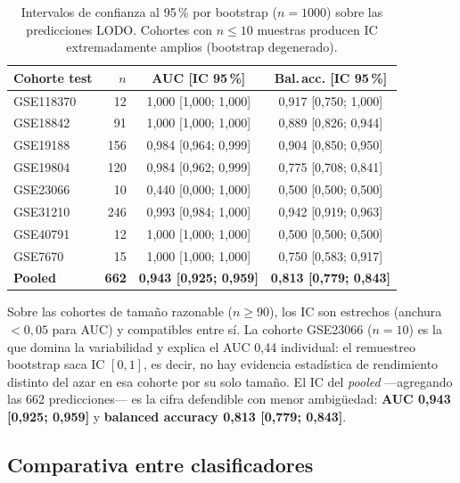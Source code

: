\begin{table}[H]
  \centering
  \small
  \caption{Intervalos de confianza al 95\,\% por bootstrap ($n=1000$) sobre
  las predicciones LODO. Cohortes con $n \leq 10$ muestras producen IC
  extremadamente amplios (bootstrap degenerado).}
  \label{tab:ic_bootstrap}
  \begin{tabular}{lrcc}
    \toprule
    \textbf{Cohorte test} & $n$ & \textbf{AUC [IC 95\,\%]} & \textbf{Bal.\,acc. [IC 95\,\%]} \\
    \midrule
    GSE118370          & 12  & 1,000 [1,000; 1,000] & 0,917 [0,750; 1,000] \\
    GSE18842           & 91  & 1,000 [1,000; 1,000] & 0,889 [0,826; 0,944] \\
    GSE19188           & 156 & 0,984 [0,964; 0,999] & 0,904 [0,850; 0,950] \\
    GSE19804           & 120 & 0,984 [0,962; 0,999] & 0,775 [0,708; 0,841] \\
    GSE23066           & 10  & 0,440 [0,000; 1,000] & 0,500 [0,500; 0,500] \\
    GSE31210           & 246 & 0,993 [0,984; 1,000] & 0,942 [0,919; 0,963] \\
    GSE40791           & 12  & 1,000 [1,000; 1,000] & 0,500 [0,500; 0,500] \\
    GSE7670            & 15  & 1,000 [1,000; 1,000] & 0,750 [0,583; 0,917] \\
    \midrule
    \textbf{Pooled}    & \textbf{662} & \textbf{0,943 [0,925; 0,959]} & \textbf{0,813 [0,779; 0,843]} \\
    \bottomrule
  \end{tabular}
\end{table}

Sobre las cohortes de tamaño razonable ($n \geq 90$), los IC son estrechos
(anchura $< 0{,}05$ para AUC) y compatibles entre sí. La cohorte GSE23066
($n=10$) es la que domina la variabilidad y explica el AUC 0,44 individual:
el remuestreo bootstrap saca IC $[0, 1]$, es decir, no hay evidencia
estadística de rendimiento distinto del azar en esa cohorte por su solo
tamaño. El IC del \emph{pooled} —agregando las 662 predicciones— es la
cifra defendible con menor ambigüedad: \textbf{AUC 0,943 [0,925; 0,959]}
y \textbf{balanced accuracy 0,813 [0,779; 0,843]}.

\subsection{Comparativa entre clasificadores}
\label{sec:res_comparativa_ml}

